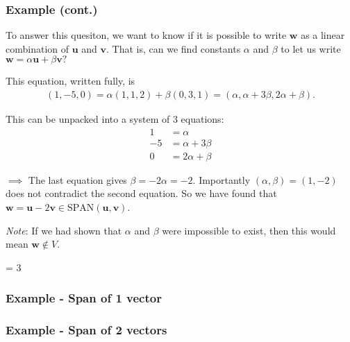 \documentclass[usenames,dvipsnames,aspectratio=169,10pt]{beamer}
\def \EXAMPLEVERSION {1} %
\numberwithin{equation}{section}
\begin{document}
\begin{frame}
\frametitle{Example (cont.)}
To answer this quesiton, we want to know if it is possible to write $\textbf{w}$ as a linear combination of $\textbf{u}$ and $\textbf{v}$. That is, can we find constants $\alpha$ and $\beta$ to let us write $\textbf{w} = \alpha \textbf{u} + \beta \textbf{v}?$

This equation, written fully, is
\begin{align*}
(1,-5,0) = \alpha(1,1,2) +\beta(0,3,1) = (\alpha,\alpha+3\beta,2\alpha+\beta).
\end{align*}
\begin{minipage}{0.4\textwidth}
This can be unpacked into a system of 3 equations:
\begin{align*}
  1 &= \alpha \\
 -5 &= \alpha+3\beta\\
  0 &= 2\alpha+\beta
\end{align*}
\end{minipage}\hspace{0.5cm}
\begin{minipage}{0.5\textwidth}
$\implies$ The last equation gives $\beta = -2\alpha = -2$. Importantly $(\alpha,\beta)=(1,-2)$ does not contradict the second equation. So we have found that $\textbf{w} = \textbf{u} -2 \textbf{v} \in \text{SPAN}(\textbf{u},\textbf{v})$.
\end{minipage}

\vspace{0.5cm}
\textit{Note}: If we had shown that $\alpha$ and $\beta$ were impossible to exist, then this would mean $\textbf{w} \notin V$.
\end{frame}
\fi



\ifnum \EXAMPLEVERSION = 3
\begin{frame}
\frametitle{Example - Span of 1 vector}
\end{frame}

\begin{frame}
\frametitle{Example - Span of 2 vectors}
\end{frame}
\end{document}
